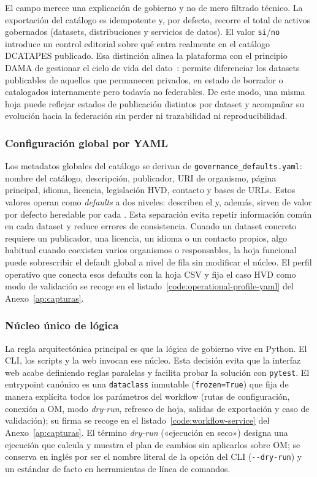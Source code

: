 El campo  merece una explicación de gobierno y no de mero filtrado técnico. La exportación del catálogo es idempotente y, por defecto, recorre el total de activos gobernados (datasets, distribuciones y servicios de datos). El valor \texttt{si}/\texttt{no} introduce un control editorial sobre qué entra realmente en el catálogo \ac{DCATAPES} publicado. Esa distinción alinea la plataforma con el principio \ac{DAMA} de gestionar el ciclo de vida del dato~\cite{damaDmbok}: permite diferenciar los datasets publicables de aquellos que permanecen privados, en estado de borrador o catalogados internamente pero todavía no federables. De este modo, una misma hoja puede reflejar estados de publicación distintos por dataset y acompañar su evolución hacia la federación sin perder ni trazabilidad ni reproducibilidad.

\subsubsection{Configuración global por YAML}

Los metadatos globales del catálogo se derivan de \texttt{governance\_defaults.yaml}: nombre del catálogo, descripción, publicador, URI de organismo, página principal, idioma, licencia, legislación HVD, contacto y bases de URLs. Estos valores operan como \emph{defaults} a dos niveles: describen el  y, además, sirven de valor por defecto heredable por cada . Esta separación evita repetir información común en cada dataset y reduce errores de consistencia. Cuando un dataset concreto requiere un publicador, una licencia, un idioma o un contacto propios, algo habitual cuando coexisten varios organismos o responsables, la hoja funcional puede sobrescribir el default global a nivel de fila sin modificar el núcleo. El perfil operativo que conecta esos defaults con la hoja \ac{CSV} y fija el caso \ac{HVD} como modo de validación se recoge en el listado~\ref{code:operational-profile-yaml} del Anexo~\ref{ap:capturas}.

\subsubsection{Núcleo único de lógica}

La regla arquitectónica principal es que la lógica de gobierno vive en Python. El \ac{CLI}, los scripts y la web invocan ese núcleo. Esta decisión evita que la interfaz web acabe definiendo reglas paralelas y facilita probar la solución con \texttt{pytest}. El entrypoint canónico es una \texttt{dataclass} inmutable (\texttt{frozen=True}) que fija de manera explícita todos los parámetros del workflow (rutas de configuración, conexión a \ac{OM}, modo \emph{dry-run}, refresco de hoja, salidas de exportación y caso de validación); su firma se recoge en el listado~\ref{code:workflow-service} del Anexo~\ref{ap:capturas}. El término \emph{dry-run} («ejecución en seco») designa una ejecución que calcula y muestra el plan de cambios sin aplicarlos sobre \ac{OM}; se conserva en inglés por ser el nombre literal de la opción del \ac{CLI} (\texttt{-{}-dry-run}) y un estándar de facto en herramientas de línea de comandos.

